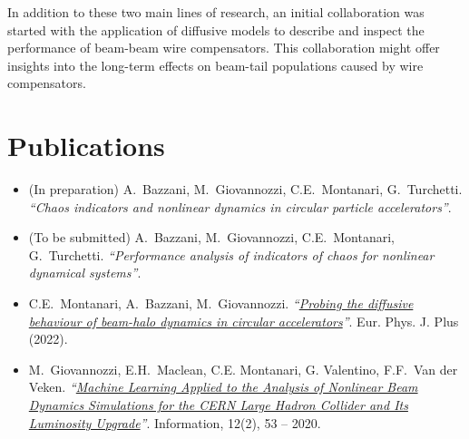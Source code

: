 In addition to these two main lines of research, an initial collaboration was
started with the application of diffusive models to describe and inspect the
performance of beam-beam wire compensators. This collaboration might offer
insights into the long-term effects on beam-tail populations caused by wire
compensators.

\section*{Publications}

\begin{itemize}
    \item (In preparation) A.\ Bazzani, M.\ Giovannozzi, C.E.\ Montanari, G.\ Tur\-chet\-ti. \textit{``Chaos indicators and nonlinear dynamics in circular particle accelerators''}.
    
    \item (To be submitted) A.\ Bazzani, M.\ Giovannozzi, C.E.\ Montanari, G.\ Turchetti. \textit{``Performance analysis of indicators of chaos for nonlinear dynamical systems''}.

    \item  C.E.\ Montanari, A.\ Bazzani, M.\ Giovannozzi. \textit{``\href{https://doi.org/10.1140/epjp/s13360-022-03478-w}{Probing the diffusive behaviour of beam-halo dynamics in circular accelerators}''}. Eur. Phys. J. Plus (2022).

    \item M.\ Giovannozzi, E.H.\ Maclean, C.E. Montanari, G. Valentino, F.F.\ Van der Veken. \textit{``\href{https://doi.org/10.3390/info12020053}{Machine Learning Applied to the Analysis of Nonlinear Beam Dynamics Simulations for the CERN Large Hadron Collider and Its Luminosity Upgrade}''}. Information, 12(2), 53 -- 2020.

\end{itemize}

